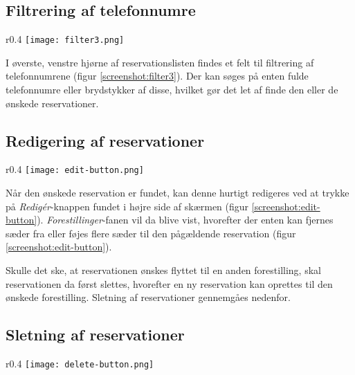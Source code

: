 \subsection{Filtrering af telefonnumre}

\begin{wrapfigure}[3]{r}{0.4\textwidth}
  \centering
  \vspace{-12pt}
  \texttt{[image: filter3.png]}
  \caption{Filtrering af telefonnumre}
  \label{screenshot:filter3}
\end{wrapfigure}

I øverste, venstre hjørne af reservationslisten findes et felt til filtrering af telefonnumrene (figur \ref{screenshot:filter3}). Der kan søges på enten fulde telefonnumre eller brydstykker af disse, hvilket gør det let af finde den eller de ønskede reservationer.

\subsection{Redigering af reservationer}

\begin{wrapfigure}{r}{0.4\textwidth}
  \centering
  \vspace{-12pt}
  \texttt{[image: edit-button.png]}
  \caption{Mulighed for redigering af reservationer}
  \label{screenshot:edit-button}
\end{wrapfigure}

Når den ønskede reservation er fundet, kan denne hurtigt redigeres ved at trykke på \textit{Redigér}-knappen fundet i højre side af skærmen (figur \ref{screenshot:edit-button}). \textit{Forestillinger}-fanen vil da blive vist, hvorefter der enten kan fjernes sæder fra eller føjes flere sæder til den pågældende reservation (figur \ref{screenshot:edit-button}).

Skulle det ske, at reservationen ønskes flyttet til en anden forestilling, skal reservationen da først slettes, hvorefter en ny reservation kan oprettes til den ønskede forestilling. Sletning af reservationer gennemgåes nedenfor.

\subsection{Sletning af reservationer}

\begin{wrapfigure}{r}{0.4\textwidth}
  \centering
  \vspace{-12pt}
  \texttt{[image: delete-button.png]}
  \caption{Mulighed for sletning af reservationer}
  \label{screenshot:delete-button}
\end{wrapfigure}

